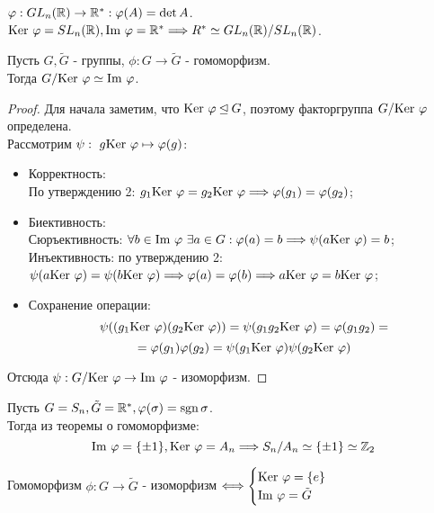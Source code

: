\begin{example}
    $\phi: GL_n(\R) \rightarrow \R^* : \phi(A) = \det A$.\\
    $\textup{Ker }\phi = SL_n(\R), \textup{Im }\phi = \R^* \Longrightarrow R^* \simeq GL_n(\R) / SL_n(\R)$.
\end{example}
\begin{theorem}[О гомоморфизме]
    Пусть $G, \tilde{G}$ - группы, $\phi: G \rightarrow \tilde{G}$ - гомоморфизм.\\
    Тогда $G / \textup{Ker }\phi \simeq \textup{Im } \phi$.
\end{theorem}
\begin{proof}
    Для начала заметим, что $\textup{Ker } \phi \unlhd G$, поэтому факторгруппа $G / \textup{Ker }\phi$ определена.\\
    Рассмотрим $\psi: \ g \textup{Ker }\phi \mapsto \phi(g)$:
    \begin{itemize}
        \item Корректность:\\
        По утверждению 2: $g_1 \textup{Ker }\phi = g_2 \textup{Ker }\phi \Longrightarrow \phi(g_1) = \phi(g_2)$;
        \item Биективность:\\
        Сюръективность: $\forall b \in \textup{Im } \phi \ \exists a \in G: \phi(a) = b \Longrightarrow \psi(a \textup{Ker }\phi) = b$;\\
        Инъективность: по утверждению 2: $\psi(a \textup{Ker }\phi) = \psi(b \textup{Ker }\phi) \Longrightarrow \phi(a) = \phi(b) \Longrightarrow a \textup{Ker }\phi = b \textup{Ker }\phi$;
        \item Сохранение операции:
        \[\psi((g_1 \textup{Ker }\phi)(g_2 \textup{Ker }\phi)) = \psi(g_1g_2 \textup{Ker }\phi) = \phi(g_1g_2) =\]
        \[ = \phi(g_1)\phi(g_2) = \psi(g_1 \textup{Ker }\phi)\psi(g_2 \textup{Ker }\phi)\]
    \end{itemize}
    Отсюда $\psi: G/\textup{Ker }\phi \rightarrow \textup{Im }\phi$ - изоморфизм.
\end{proof}
\begin{example}
    Пусть $G = S_n, \tilde{G} = \R^*, \phi(\sigma) = \sgn \sigma$.\\
    Тогда из теоремы о гомоморфизме: 
    \[\textup{Im }\phi = \{\pm 1\}, \textup{Ker }\phi = A_n \Longrightarrow S_n / A_n \simeq \{\pm 1\} \simeq \Z_2\]
\end{example}
\begin{consequensenum}
    Гомоморфизм $\phi: G \rightarrow \tilde{G}$ - изоморфизм $\Longleftrightarrow \begin{cases}
        \textup{Ker }\phi = \{e\}\\
        \textup{Im }\phi = \tilde{G}
    \end{cases}$
\end{consequensenum}
